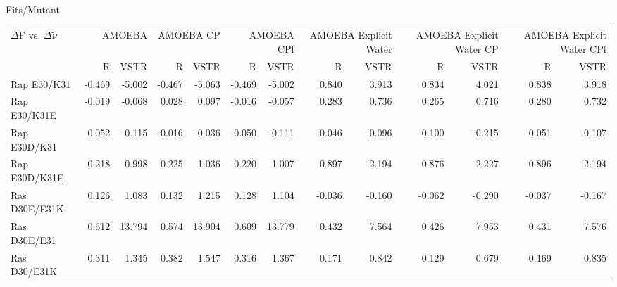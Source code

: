 \documentclass[landscape]{article}
\begin{document}
	
	
	
Fits/Mutant \\
{
\begin{tabular}{ l || r r | r r | r r | r r| r r | r r}
$\Delta$F vs. $\Delta \tilde \nu$ & \multicolumn{2}{|C{2cm}}{AMOEBA} & \multicolumn{2}{|C{2cm}}{AMOEBA CP} & \multicolumn{2}{|C{2cm}}{AMOEBA CPf} & \multicolumn{2}{|C{2cm}}{AMOEBA Explicit Water} & \multicolumn{2}{|C{2cm}}{AMOEBA Explicit Water CP} & \multicolumn{2}{|C{2cm}}{AMOEBA Explicit Water CPf} \\
 & \multicolumn{1}{|C{1cm}}{R} & \multicolumn{1}{C{1cm}}{VSTR} & \multicolumn{1}{|C{1cm}}{R} & \multicolumn{1}{C{1cm}}{VSTR} & \multicolumn{1}{|C{1cm}}{R} & \multicolumn{1}{C{1cm}}{VSTR}  & \multicolumn{1}{|C{1cm}}{R} & \multicolumn{1}{C{1cm}}{VSTR} & \multicolumn{1}{|C{1cm}}{R} & \multicolumn{1}{C{1cm}}{VSTR} & \multicolumn{1}{|C{1cm}}{R} & \multicolumn{1}{C{1cm}}{VSTR} \\
\hline\hline	
Rap E30/K31    & -0.469         & -5.002         & -0.467         & -5.063         & -0.469         & -5.002         & 0.840          & 3.913          & 0.834          & 4.021          & 0.838          & 3.918         \\
Rap E30/K31E   & -0.019         & -0.068         & 0.028          & 0.097          & -0.016         & -0.057         & 0.283          & 0.736          & 0.265          & 0.716          & 0.280          & 0.732         \\
Rap E30D/K31   & -0.052         & -0.115         & -0.016         & -0.036         & -0.050         & -0.111         & -0.046         & -0.096         & -0.100         & -0.215         & -0.051         & -0.107        \\
Rap E30D/K31E  & 0.218          & 0.998          & 0.225          & 1.036          & 0.220          & 1.007          & 0.897          & 2.194          & 0.876          & 2.227          & 0.896          & 2.194         \\
Ras D30E/E31K  & 0.126          & 1.083          & 0.132          & 1.215          & 0.128          & 1.104          & -0.036         & -0.160         & -0.062         & -0.290         & -0.037         & -0.167        \\
Ras D30E/E31   & 0.612          & 13.794         & 0.574          & 13.904         & 0.609          & 13.779         & 0.432          & 7.564          & 0.426          & 7.953          & 0.431          & 7.576         \\
Ras D30/E31K   & 0.311          & 1.345          & 0.382          & 1.547          & 0.316          & 1.367          & 0.171          & 0.842          & 0.129          & 0.679          & 0.169          & 0.835         \\

\end{tabular}}
\end{document}

